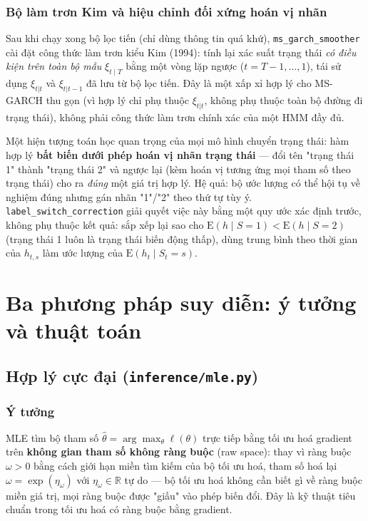 \documentclass[11pt,a4paper]{article}
\newcommand{\code}[1]{\texttt{#1}}
\newcommand{\file}[1]{\texttt{#1}}
\begin{document}
\subsubsection{Bộ làm trơn Kim và hiệu chỉnh đối xứng hoán vị nhãn}

Sau khi chạy xong bộ lọc tiến (chỉ dùng thông tin quá khứ), \code{ms\_garch\_smoother}
cài đặt công thức làm trơn kiểu Kim (1994): tính lại xác suất trạng thái \emph{có
điều kiện trên toàn bộ mẫu} $\xi_{t\mid T}$ bằng một vòng lặp ngược ($t=T-1,\dots,1$),
tái sử dụng $\xi_{t|t}$ và $\xi_{t|t-1}$ đã lưu từ bộ lọc tiến. Đây là một xấp xỉ hợp
lý cho MS-GARCH thu gọn (vì hợp lý chỉ phụ thuộc $\xi_{t|t}$, không phụ thuộc toàn bộ
đường đi trạng thái), không phải công thức làm trơn chính xác của một HMM đầy đủ.

Một hiện tượng toán học quan trọng của mọi mô hình chuyển trạng thái: hàm hợp lý
\textbf{bất biến dưới phép hoán vị nhãn trạng thái} --- đổi tên "trạng thái 1" thành
"trạng thái 2" và ngược lại (kèm hoán vị tương ứng mọi tham số theo trạng thái) cho ra
\emph{đúng} một giá trị hợp lý. Hệ quả: bộ ước lượng có thể hội tụ về nghiệm đúng
nhưng gán nhãn "1"/"2" theo thứ tự tùy ý. \code{label\_switch\_correction} giải quyết
việc này bằng một quy ước xác định trước, không phụ thuộc kết quả: sắp xếp lại sao
cho $\mathrm E(h\mid S{=}1) < \mathrm E(h\mid S{=}2)$ (trạng thái 1 luôn là trạng thái
biến động thấp), dùng trung bình theo thời gian của $h_{t,s}$ làm ước lượng của
$\mathrm E(h_t\mid S_t=s)$.

\section{Ba phương pháp suy diễn: ý tưởng và thuật toán}

\subsection{Hợp lý cực đại (\file{inference/mle.py})}

\subsubsection{Ý tưởng}

MLE tìm bộ tham số $\hat\theta = \arg\max_\theta \ell(\theta)$ trực tiếp bằng tối ưu
hoá gradient trên \textbf{không gian tham số không ràng buộc} (raw space): thay vì
ràng buộc $\omega>0$ bằng cách giới hạn miền tìm kiếm của bộ tối ưu hoá, tham số hoá
lại $\omega = \exp(\eta_\omega)$ với $\eta_\omega \in \mathbb R$ tự do --- bộ tối ưu
hoá không cần biết gì về ràng buộc miền giá trị, mọi ràng buộc được "giấu" vào phép
biến đổi. Đây là kỹ thuật tiêu chuẩn trong tối ưu hoá có ràng buộc bằng gradient.
\end{document}
